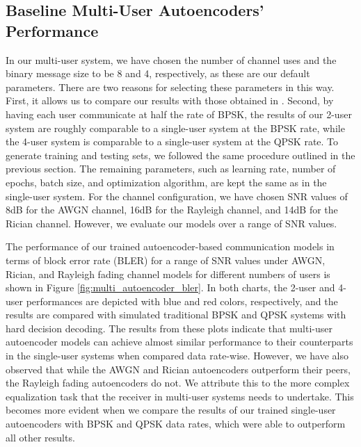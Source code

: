 \subsection{Baseline Multi-User Autoencoders' Performance}
In our multi-user system, we have chosen the number of channel uses and the binary message size to be 8 and 4, respectively, as these are our default parameters. There are two reasons for selecting these parameters in this way. First, it allows us to compare our results with those obtained in \cite{o2017introduction}. Second, by having each user communicate at half the rate of BPSK, the results of our 2-user system are roughly comparable to a single-user system at the BPSK rate, while the 4-user system is comparable to a single-user system at the QPSK rate. To generate training and testing sets, we followed the same procedure outlined in the previous section. The remaining parameters, such as learning rate, number of epochs, batch size, and optimization algorithm, are kept the same as in the single-user system. For the channel configuration, we have chosen SNR values of 8dB for the AWGN channel, 16dB for the Rayleigh channel, and 14dB for the Rician channel. However, we evaluate our models over a range of SNR values.

The performance of our trained autoencoder-based communication models in terms of block error rate (BLER) for a range of SNR values under AWGN, Rician, and Rayleigh fading channel models for different numbers of users is shown in Figure \ref{fig:multi_autoencoder_bler}. In both charts, the 2-user and 4-user performances are depicted with blue and red colors, respectively, and the results are compared with simulated traditional BPSK and QPSK systems with hard decision decoding.
The results from these plots indicate that multi-user autoencoder models can achieve almost similar performance to their counterparts in the single-user systems when compared data rate-wise. However, we have also observed that while the AWGN and Rician autoencoders outperform their peers, the Rayleigh fading autoencoders do not. We attribute this to the more complex equalization task that the receiver in multi-user systems needs to undertake. This becomes more evident when we compare the results of our trained single-user autoencoders with BPSK and QPSK data rates, which were able to outperform all other results.

